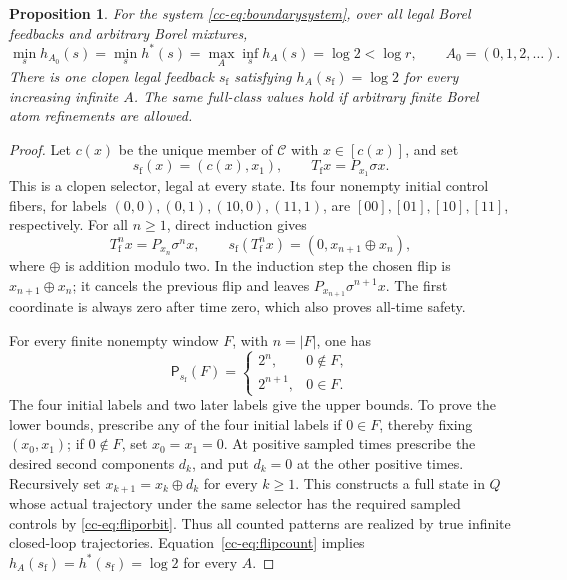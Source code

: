 \documentclass[11pt,reqno]{amsart}
\numberwithin{equation}{section}
\newtheorem{proposition}[theorem]{Proposition}
\theoremstyle{definition}
\newcommand{\Patt}{\mathsf P}
\newcommand{\hpat}{h^{*}}
\begin{document}
\begin{proposition}\label{cc-prop:boundary}
For the system \eqref{cc-eq:boundarysystem}, over all legal Borel feedbacks
and arbitrary Borel mixtures,
\begin{equation}\label{cc-eq:boundaryvalue}
 \min_s h_{A_0}(s)=\min_s\hpat(s)=
 \max_A\inf_s h_A(s)=\log2<\log r,
 \qquad A_0=(0,1,2,\ldots).
\end{equation}
There is one clopen legal feedback $s_{\mathrm f}$ satisfying
$h_A(s_{\mathrm f})=\log2$ for every increasing infinite $A$.
The same full-class values hold if arbitrary finite Borel atom
refinements are allowed.
\end{proposition}
\begin{proof}
Let $c(x)$ be the unique member of $\mathcal C$ with $x\in[c(x)]$,
and set
\[
 s_{\mathrm f}(x)=(c(x),x_1),\qquad
 T_{\mathrm f}x=P_{x_1}\sigma x.
\]
This is a clopen selector, legal at every state. Its four nonempty
initial control fibers, for labels $(0,0),(0,1),(10,0),(11,1)$, are
$[00],[01],[10],[11]$, respectively. For all $n\ge1$, direct induction
gives
\begin{equation}\label{cc-eq:fliporbit}
 T_{\mathrm f}^n x=P_{x_n}\sigma^n x,
 \qquad s_{\mathrm f}(T_{\mathrm f}^n x)
        =(0,x_{n+1}\mathbin\oplus x_n),
\end{equation}
where $\oplus$ is addition modulo two. In the induction step the
chosen flip is $x_{n+1}\oplus x_n$; it cancels the previous flip and
leaves $P_{x_{n+1}}\sigma^{n+1}x$. The first coordinate is always zero
after time zero, which also proves all-time safety.

For every finite nonempty window $F$, with $n=|F|$, one has
\begin{equation}\label{cc-eq:flipcount}
 \Patt_{s_{\mathrm f}}(F)=
 \begin{cases}2^n,&0\notin F,\\2^{n+1},&0\in F.\end{cases}
\end{equation}
The four initial labels and two later labels give the upper bounds.
To prove the lower bounds, prescribe any of the four initial labels
if $0\in F$, thereby fixing $(x_0,x_1)$; if $0\notin F$, set
$x_0=x_1=0$. At positive sampled times prescribe the desired second
components $d_k$, and put $d_k=0$ at the other positive times.
Recursively set $x_{k+1}=x_k\oplus d_k$ for every $k\ge1$.
This constructs a full state in $Q$ whose actual trajectory under the
same selector has the required sampled controls by
\eqref{cc-eq:fliporbit}. Thus all counted patterns are realized by true
infinite closed-loop trajectories. Equation~\eqref{cc-eq:flipcount}
implies $h_A(s_{\mathrm f})=\hpat(s_{\mathrm f})=\log2$ for every $A$.


\end{proof}
\end{document}
